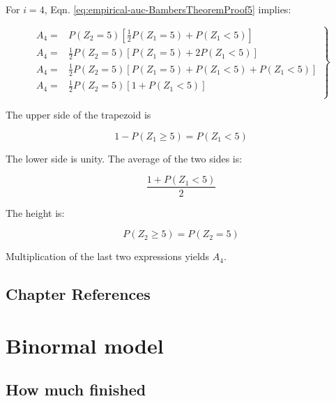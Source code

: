 \documentclass[
]{book}
\begin{document}
For \(i = 4\), Eqn. \eqref{eq:empirical-auc-BambersTheoremProof5} implies:

\begin{equation}
\left.
\begin{aligned}
A_4 =& P\left ( Z_2=5 \right )\left [ \frac{1}{2}P\left ( Z_1=5 \right ) + P\left ( Z_1<5 \right )\right ] \\
A_4 =& \frac{1}{2}P\left ( Z_2=5 \right )\left [ P\left ( Z_1=5 \right ) + 2P\left ( Z_1<5 \right )\right ] \\
A_4 =& \frac{1}{2}P\left ( Z_2=5 \right )\left [ P\left ( Z_1=5 \right ) +P\left ( Z_1<5 \right ) + P\left ( Z_1<5 \right )\right ] \\
A_4 =& \frac{1}{2}P\left ( Z_2=5 \right )\left [ 1 + P\left ( Z_1<5 \right )\right ] \\
\end{aligned}
\right \}
\end{equation}

The upper side of the trapezoid is

\begin{equation}
1-P\left ( Z_1 \geq 5 \right )= P\left ( Z_1 < 5 \right )
\end{equation}

The lower side is unity. The average of the two sides is:

\begin{equation}
\frac{1 + P\left ( Z_1 < 5 \right )}{2}
\end{equation}

The height is:

\begin{equation}
P\left ( Z_2 \geq 5 \right ) = P\left ( Z_2 = 5 \right )
\end{equation}

Multiplication of the last two expressions yields \(A_4\).

\hypertarget{empirical-auc-references}{%
\section{Chapter References}\label{empirical-auc-references}}

\hypertarget{binormal-model}{%
\chapter{Binormal model}\label{binormal-model}}

\hypertarget{binormal-model-how-much-finished}{%
\section{How much finished}\label{binormal-model-how-much-finished}}
\end{document}
